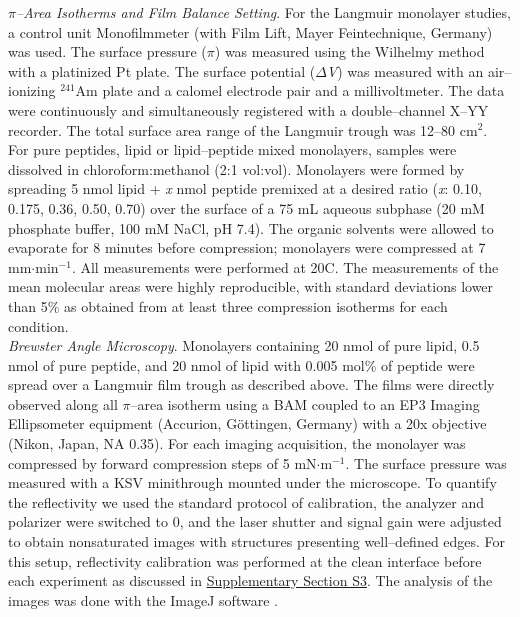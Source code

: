 \documentclass[journal=jacsat,manuscript=article]{achemso}
\begin{document}
\noindent \textit{$\pi$–Area Isotherms and Film Balance Setting}. For the Langmuir monolayer studies, a control unit Monofilmmeter (with Film Lift, Mayer Feintechnique, Germany) was used. The surface pressure ($\pi$) was measured using the Wilhelmy method with a platinized Pt plate. The surface potential ($\Delta$\textit{V}) was measured with an air–ionizing $^{241}$Am plate and a calomel electrode pair and a millivoltmeter. The data were continuously and simultaneously registered with a double–channel X–YY recorder. The total surface area range of the Langmuir trough was 12–80 cm$^2$. For pure peptides, lipid or lipid–peptide mixed monolayers, samples were dissolved in chloroform:methanol (2:1 vol:vol). Monolayers were formed by spreading 5 nmol lipid + \textit{x} nmol  peptide premixed at a desired ratio (\textit{x}: 0.10, 0.175, 0.36, 0.50, 0.70) over the surface of a 75 mL aqueous subphase (20 mM phosphate buffer, 100 mM NaCl, pH 7.4). The organic solvents were allowed to evaporate for 8 minutes before compression; monolayers were compressed at 7 mm$\cdot$min$^{-1}$. All measurements were performed at 20\textdegree C. The measurements of the mean molecular areas were highly reproducible, with standard deviations lower than 5\% as obtained from at least three compression isotherms for each condition.\\

\noindent \textit{Brewster Angle Microscopy}. Monolayers containing 20 nmol of pure lipid, 0.5 nmol of pure peptide, and 20 nmol of lipid with 0.005 mol\% of peptide were spread over a Langmuir film trough as described above. The films were directly observed along all $\pi$–area isotherm using a BAM coupled to an EP3 Imaging Ellipsometer equipment (Accurion, G{\"o}ttingen, Germany) with a 20x objective (Nikon, Japan, NA 0.35). For each imaging acquisition, the monolayer was compressed by forward compression steps of 5 mN$\cdot$m$^{-1}$. The surface pressure was measured with a KSV minithrough mounted under the microscope. To quantify the reflectivity we used the standard protocol of calibration, the analyzer and polarizer were switched to 0\textdegree, and the laser shutter and signal gain were adjusted to obtain nonsaturated images with structures presenting well–defined edges. For this setup, reflectivity calibration was performed at the clean interface before each experiment as discussed in \hyperref[sec:support]{Supplementary Section S3}. The analysis of the images was done with the ImageJ software \cite{2012_Schneider}.

\end{document}
